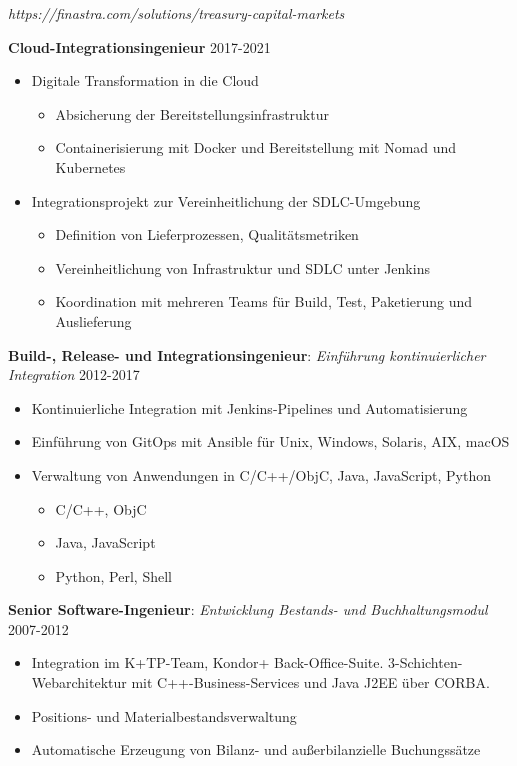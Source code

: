 \documentclass[11pt,a4paper]{moderncv}
\begin{document}
{
\textit{https://finastra.com/solutions/treasury-capital-markets}
\bigskip

\textbf{Cloud-Integrationsingenieur} \hfill 2017-2021
\bigskip
	\begin{itemize}%
		\item Digitale Transformation in die Cloud
			\begin{itemize}%
				\item Absicherung der Bereitstellungsinfrastruktur
				\item Containerisierung mit Docker und Bereitstellung mit Nomad und Kubernetes
			\end{itemize}
	\end{itemize}
\bigskip
	\begin{itemize}%
	\item	Integrationsprojekt zur Vereinheitlichung der SDLC-Umgebung
		\begin{itemize}%
				\item Definition von Lieferprozessen, Qualitätsmetriken
				\item Vereinheitlichung von Infrastruktur und SDLC unter Jenkins
				\item Koordination mit mehreren Teams für Build, Test, Paketierung und Auslieferung
		\end{itemize}
	\end{itemize}
\bigskip
 \textbf{Build-, Release- und Integrationsingenieur}: \textit{Einführung kontinuierlicher Integration} \hfill 2012-2017
\bigskip
			\begin{itemize}%
				\item Kontinuierliche Integration mit Jenkins-Pipelines und Automatisierung
                \item Einführung von GitOps mit Ansible für Unix, Windows, Solaris, AIX, macOS
				\item Verwaltung von Anwendungen in C/C++/ObjC, Java, JavaScript, Python
					\begin{itemize}
						\item C/C++, ObjC
						\item Java, JavaScript
						\item Python, Perl, Shell
					\end{itemize}
				\end{itemize}
\bigskip
\textbf{Senior Software-Ingenieur}: \textit{Entwicklung Bestands- und Buchhaltungsmodul} \hfill 2007-2012

\bigskip
			\begin{itemize}
				\item Integration im K+TP-Team, Kondor+ Back-Office-Suite. 3-Schichten-Webarchitektur mit C++-Business-Services und Java J2EE über CORBA.
				\item Positions- und Materialbestandsverwaltung
				\item Automatische Erzeugung von Bilanz- und außerbilanzielle Buchungssätze
			\end{itemize}
}
\end{document}
